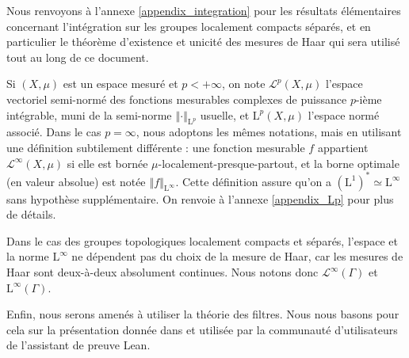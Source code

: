 \documentclass[a4paper,12pt]{article}
\newcommand{\Bor}{\mathcal{B}}
\newcommand{\norm}[1]{\left\Vert #1\right\Vert}
\begin{document}
Nous renvoyons à l'annexe \ref{appendix_integration} pour les résultats élémentaires concernant l'intégration 
sur les groupes localement compacts séparés, et en particulier le théorème d'existence et unicité des mesures de Haar 
qui sera utilisé tout au long de ce document.

Si $(X, \mu)$ est un espace mesuré et $p<+\infty$, on note $\mathscr{L}^p(X, \mu)$ l'espace vectoriel semi-normé des fonctions mesurables complexes 
de puissance $p$-ième intégrable, muni de la semi-norme $\norm{\cdot}_{\mathrm{L}^p}$ usuelle, et $\mathrm{L}^p(X, \mu)$ l'espace normé associé. 
Dans le cas $p=\infty$, nous adoptons les mêmes notations, mais en utilisant une définition subtilement 
différente : une fonction mesurable $f$ appartient $\mathscr{L}^\infty(X, \mu)$ si elle est bornée 
$\mu$-localement-presque-partout, et la borne optimale (en valeur absolue) est notée $\norm{f}_{\mathrm{L}^\infty}$.
Cette définition assure qu'on a $(\mathrm{L}^1)^* \simeq \mathrm{L}^\infty$ sans hypothèse supplémentaire. On renvoie à l'annexe \ref{appendix_Lp}
pour plus de détails.

Dans le cas des groupes topologiques localement compacts et séparés, l'espace et la norme $\mathrm{L}^\infty$ ne dépendent pas du choix de la mesure de 
Haar, car les mesures de Haar sont deux-à-deux absolument continues. Nous notons donc $\mathscr{L}^\infty(\Gamma)$ et $\mathrm{L}^\infty(\Gamma)$.

Enfin, nous serons amenés à utiliser la théorie des filtres. Nous nous basons pour cela 
sur la présentation donnée dans \cite[\textit{Mathematics In Lean}]{MIL2023} et utilisée par la communauté 
d'utilisateurs de l'assistant de preuve Lean.

%
\end{document}
